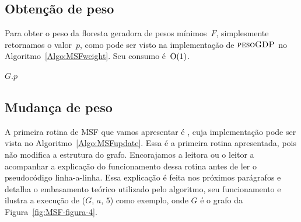 \subsection{Obtenção de peso}

Para obter o peso da floresta geradora de pesos mínimos~$F$, simplesmente retornamos o valor~$p$, como pode ser visto na implementação de $\text{\scshape pesoGDP}$ no Algoritmo~\ref{Algo:MSFweight}.
Seu consumo é~$\mathrm{O}(1)$.
\begin{algorithm}[htb]
\caption{\MSFweight($G$)}
\label{Algo:MSFweight}
\begin{algorithmic}[1]
\State \Return $G$.$p$
\end{algorithmic}
\end{algorithm}

\subsection{Mudança de peso}
A primeira rotina de MSF que vamos apresentar é \MSFupdate{}, cuja implementação pode ser vista no Algoritmo~\ref{Algo:MSFupdate}.
Essa é a primeira rotina apresentada, pois não modifica a estrutura do grafo.
Encorajamos a leitora ou o leitor a acompanhar a explicação do funcionamento dessa rotina antes de ler o pseudocódigo linha-a-linha.
Essa explicação é feita nos próximos parágrafos e detalha o embasamento teórico utilizado pelo algoritmo, seu funcionamento e ilustra a execução de \MSFupdate($G$, $a$, $5$) como exemplo, onde $G$ é o grafo da Figura~\ref{fig:MSF-figura-4}.


